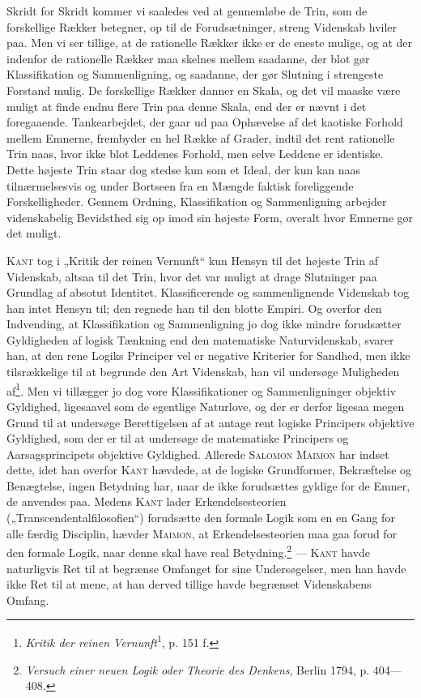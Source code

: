 \documentclass[12pt]{article}
\newcommand{\opage}[1]{\marginnote{\footnotesize\textit{[#1]}}}
\begin{document}
Skridt for Skridt kommer vi saaledes ved at gennemløbe de Trin, som de
forskellige Rækker betegner, op til de Forudsætninger, streng Videnskab hviler
paa. Men vi ser tillige, at de rationelle Rækker ikke er de eneste mulige, og at
der indenfor de rationelle Rækker maa skelnes mellem saadanne, der blot gør
Klassifikation og Sammenligning, og saadanne, der gør Slutning i strengeste
Forstand mulig. De forskellige Rækker danner en Skala, og det vil maaske være
muligt at finde endnu flere Trin paa
\setcounter{footnote}{0}%
\opage{11}denne Skala, end der er nævnt i det foregaaende. Tankearbejdet, der gaar
ud paa Ophævelse af det kaotiske Forhold mellem Emnerne, frembyder en hel Række
af Grader, indtil det rent rationelle Trin naas, hvor ikke blot Leddenes
Forhold, men selve Leddene er identiske. Dette højeste Trin staar dog stedse kun
som et Ideal, der kun kan naas tilnærmelsesvis og under Bortseen fra en Mængde
faktisk foreliggende Forskelligheder. Gennem Ordning, Klassifikation og
Sammenligning arbejder videnskabelig Bevidsthed sig op imod sin højeste Form,
overalt hvor Emnerne gør det muligt.

\textsc{Kant} tog i „Kritik der reinen Vernunft“ kun Hensyn til det højeste
Trin af Videnskab, altsaa til det Trin, hvor det var muligt at drage Slutninger
paa Grundlag af absotut Identitet. Klassificerende og sammenlignende Videnskab
tog han intet Hensyn til; den regnede han til den blotte Empiri. Og overfor den
Indvending, at Klassifikation og Sammenligning jo dog ikke mindre forudsætter
Gyldigheden af logisk Tænkning end den matematiske Naturvidenskab, svarer han,
at den rene Logiks Principer vel er negative Kriterier for Sandhed, men ikke
tilsrækkelige til at begrunde den Art Videnskab, han vil undersøge Muligheden
af\footnote{\textit{Kritik der reinen Vernunft}\textsuperscript{1}, p. 151 f.}.
Men vi tillægger jo dog vore Klassifikationer og Sammenligninger objektiv
Gyldighed, ligesaavel som de egentlige Naturlove, og der er derfor ligesaa megen
Grund til at undersøge Berettigelsen af at antage rent logiske Principers
objektive Gyldighed, som der er til at undersøge de matematiske Principers og
Aarsagsprincipets objektive Gyldighed. Allerede \textsc{Salomon Maimon} har
indset dette, idet han overfor \textsc{Kant} hævdede, at de logiske
Grundformer, Bekræftelse og Benægtelse, ingen Betydning har, naar de ikke
forudsættes gyldige for de Emner, de anvendes paa. Medens \textsc{Kant} lader
Erkendelsesteorien („Transcendentalfilosofien“) forudsætte den formale Logik som
en en Gang for alle færdig Disciplin, hævder \textsc{Maimon}, at
Erkendelsesteorien maa gaa forud for den formale Logik, naar denne skal have
real Betydning.\footnote{\textit{Versuch einer neuen Logik oder Theorie des
Denkens}, Berlin 1794, p. 404---408.} --- \textsc{Kant} havde naturligvis Ret
til at begrænse Omfanget for sine Undersøgelser, men han havde ikke Ret til at
mene, at han derved tillige havde begrænset Videnskabens Omfang.
\end{document}
